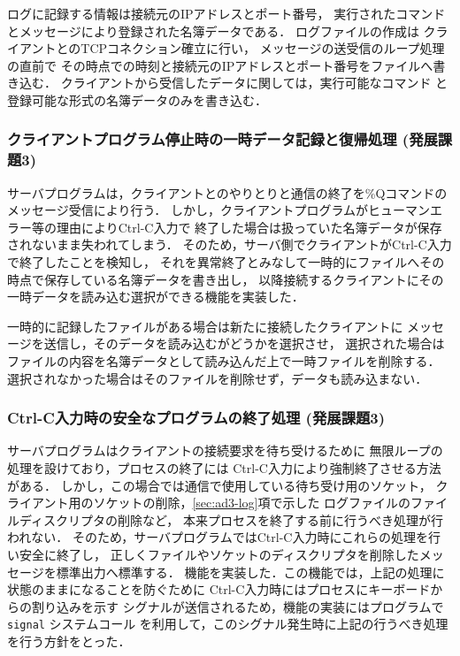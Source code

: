 ログに記録する情報は接続元のIPアドレスとポート番号，
実行されたコマンドとメッセージにより登録された名簿データである．
ログファイルの作成は
クライアントとのTCPコネクション確立に行い，
メッセージの送受信のループ処理の直前で
その時点での時刻と接続元のIPアドレスとポート番号をファイルへ書き込む．
クライアントから受信したデータに関しては，実行可能なコマンド
と登録可能な形式の名簿データのみを書き込む．

\subsubsection{クライアントプログラム停止時の一時データ記録と復帰処理 (発展課題3)} \label{sec:ad3-original}
サーバプログラムは，クライアントとのやりとりと通信の終了を\%Qコマンドのメッセージ受信により行う．
しかし，クライアントプログラムがヒューマンエラー等の理由によりCtrl-C入力で
終了した場合は扱っていた名簿データが保存されないまま失われてしまう．
そのため，サーバ側でクライアントがCtrl-C入力で終了したことを検知し，
それを異常終了とみなして一時的にファイルへその時点で保存している名簿データを書き出し，
以降接続するクライアントにその一時データを読み込む選択ができる機能を実装した．

一時的に記録したファイルがある場合は新たに接続したクライアントに
メッセージを送信し，そのデータを読み込むがどうかを選択させ，
選択された場合はファイルの内容を名簿データとして読み込んだ上で一時ファイルを削除する．
選択されなかった場合はそのファイルを削除せず，データも読み込まない．

\subsubsection{Ctrl-C入力時の安全なプログラムの終了処理 (発展課題3)} \label{sec:ad3-crtlc}
サーバプログラムはクライアントの接続要求を待ち受けるために
無限ループの処理を設けており，プロセスの終了には
Ctrl-C入力により強制終了させる方法がある．
しかし，この場合では通信で使用している待ち受け用のソケット，
クライアント用のソケットの削除，\ref{sec:ad3-log}項で示した
ログファイルのファイルディスクリプタの削除など，
本来プロセスを終了する前に行うべき処理が行われない．
そのため，サーバプログラムではCtrl-C入力時にこれらの処理を行い安全に終了し，
正しくファイルやソケットのディスクリプタを削除したメッセージを標準出力へ標準する．
機能を実装した．この機能では，上記の処理に
状態のままになることを防ぐために
Ctrl-C入力時にはプロセスにキーボードからの割り込みを示す
シグナルが送信されるため，機能の実装にはプログラムで\verb|signal| システムコール
を利用して，このシグナル発生時に上記の行うべき処理を行う方針をとった．

